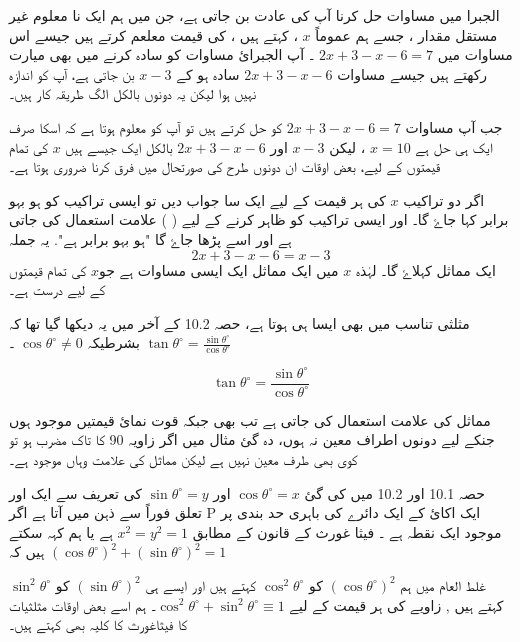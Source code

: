 






الجبرا میں مساوات حل کرنا  آپ کی عادت بن جاتی ہے، جن میں ہم ایک نا معلوم غیر مستقل مقدار ، جسے ہم عموماً \( x \) ، کہتے ہیں ، کی قیمت معلعم کرتے ہیں جیسے اس مساوات میں \( 2x+3-x-6=7 \) ۔ آپ الجبرائ مساوات کو سادہ کرنے میں بھی میارت رکھتے ہیں جیسے مساوات \( 2x+3-x-6 \) سادہ ہو کے \( x-3 \) بن جاتی ہے، آپ کو اندازہ نہیں ہوا لیکن یہ دونوں بالکل الگ طریقہ کار ہیں۔

جب آپ مساوات \( 2x+3-x-6=7 \)  کو حل کرتے ہیں تو آپ کو معلوم ہوتا ہے کہ اسکا صرف ایک ہی حل ہے  \( x=10 \) ، لیکن 
\( x-3 \) 
اور \( 2x+3-x-6 \) بالکل ایک جیسے ہیں \( x \) کی تمام قیمتوں کے لیے، بعض اوقات ان دونوں طرح کی  صورتحال میں فرق کرنا ضروری ہوتا ہے۔

اگر دو تراکیب \( x \) کی ہر قیمت کے لیے ایک سا جواب دیں تو ایسی تراکیب کو ہو بہو برابر کہا جاۓ گا۔ اور ایسی تراکیب کو ظاہر کرنے کے لیے (    )  علامت استعمال کی جاتی ہے اور اسے پڑھا جاۓ گا "ہو بہو برابر ہے". یہ جملہ \[ 2x+3-x-6=x-3 \]
ایک مماثل کہلاۓ گا۔ لہٰذہ \( x \)  میں ایک مماثل ایک ایسی مساوات ہے جو\( x \)  کی تمام قیمتوں کے لیے درست ہے۔

مثلثی تناسب میں بھی ایسا ہی ہوتا ہے، حصہ 10.2 کے آخر میں یہ دیکھا گیا تھا کہ \( \tan\theta^{\circ}=\frac{\sin\theta^{\circ}}{\cos\theta^{\circ}} \) بشرطیکہ 
\( \cos\theta^{\circ} \neq 0 \) ۔

\[ \tan\theta^{\circ}=\frac{\sin\theta^{\circ}}{\cos\theta^{\circ}} \]

مماثل کی علامت استعمال کی جاتی ہے تب بھی جبکہ قوت نمائ قیمتیں موجود ہوں جنکے لیے دونوں اطراف معین نہ ہوں، دہ گئ مثال میں اگر زاویہ 90 کا تاک مضرب ہو تو کوی بھی طرف معین نہیں ہے لیکن مماثل کی علامت وہاں موجود ہے۔


حصہ 10.1 اور 10.2 میں کی گئ 
\( \cos\theta^{\circ}=x \)  اور \( \sin\theta^{\circ}=y \) 
کی تعریف سے ایک اور تعلق فوراً سے ذہن میں آتا ہے 
اگر  P  ایک  اکائ کے ایک دائرے کی باہری حد بندی پر موجود ایک نقطہ ہے ۔ فیثا غورث کے قانون کے مطابق \( x^2 = y^2 = 1 \) ہے یا ہم کہہ سکتے ہیں کہ  \( \left(\cos\theta^{\circ}\right)^{2} + \left( \sin\theta^{\circ}\right)^{2} = 1 \) 

غلط العام میں ہم \( \left(\cos\theta^{\circ}\right)^{2} \)  کو 
 \( \cos^{2}\theta^{\circ} \)  
کہتے ہیں اور ایسے ہی \( \left(\sin\theta^{\circ}\right)^{2} \)  کو 
\( \sin^{2}\theta^{\circ} \) 
کہتے ہیں , 
زاویے کی ہر قیمت کے لیے \( \cos^{2}\theta^{\circ}+\sin^{2}\theta^{\circ}\equiv 1 \)۔ ہم اسے بعض اوقات مثلثیات کا فیثاغورث کا کلیہ بھی کہتے ہیں۔

